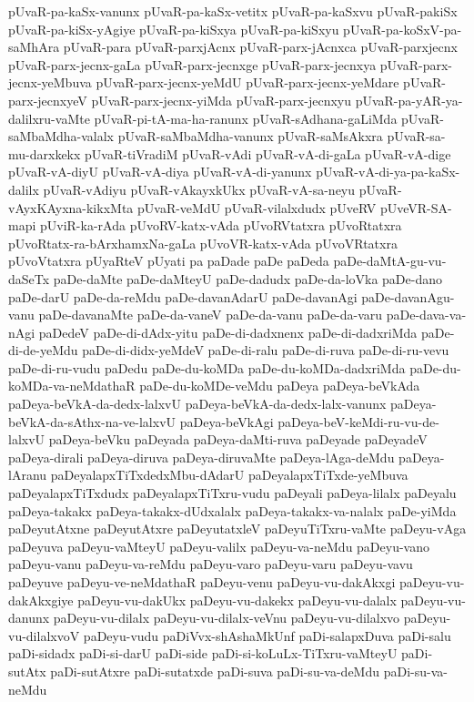 {pUvaR-pa-kaSx-vanunx
pUvaR-pa-kaSx-vetitx
pUvaR-pa-kaSxvu
pUvaR-pakiSx
pUvaR-pa-kiSx-yAgiye
pUvaR-pa-kiSxya
pUvaR-pa-kiSxyu
pUvaR-pa-koSxV-pa-saMhAra
pUvaR-para
pUvaR-parxjAcnx
pUvaR-parx-jAcnxca
pUvaR-parxjecnx
pUvaR-parx-jecnx-gaLa
pUvaR-parx-jecnxge
pUvaR-parx-jecnxya
pUvaR-parx-jecnx-yeMbuva
pUvaR-parx-jecnx-yeMdU
pUvaR-parx-jecnx-yeMdare
pUvaR-parx-jecnxyeV
pUvaR-parx-jecnx-yiMda
pUvaR-parx-jecnxyu
pUvaR-pa-yAR-ya-dalilxru-vaMte
pUvaR-pi-tA-ma-ha-ranunx
pUvaR-sAdhana-gaLiMda
pUvaR-saMbaMdha-valalx
pUvaR-saMbaMdha-vanunx
pUvaR-saMsAkxra
pUvaR-sa-mu-darxkekx
pUvaR-tiVradiM
pUvaR-vAdi
pUvaR-vA-di-gaLa
pUvaR-vA-dige
pUvaR-vA-diyU
pUvaR-vA-diya
pUvaR-vA-di-yanunx
pUvaR-vA-di-ya-pa-kaSx-dalilx
pUvaR-vAdiyu
pUvaR-vAkayxkUkx
pUvaR-vA-sa-neyu
pUvaR-vAyxKAyxna-kikxMta
pUvaR-veMdU
pUvaR-vilalxdudx
pUveRV
pUveVR-SA-mapi
pUviR-ka-rAda
pUvoRV-katx-vAda
pUvoRVtatxra
pUvoRtatxra
pUvoRtatx-ra-bArxhamxNa-gaLa
pUvoVR-katx-vAda
pUvoVRtatxra
pUvoVtatxra
pUyaRteV
pUyati
pa
paDade
paDe
paDeda
paDe-daMtA-gu-vu-daSeTx
paDe-daMte
paDe-daMteyU
paDe-dadudx
paDe-da-loVka
paDe-dano
paDe-darU
paDe-da-reMdu
paDe-davanAdarU
paDe-davanAgi
paDe-davanAgu-vanu
paDe-davanaMte
paDe-da-vaneV
paDe-da-vanu
paDe-da-varu
paDe-dava-va-nAgi
paDedeV
paDe-di-dAdx-yitu
paDe-di-dadxnenx
paDe-di-dadxriMda
paDe-di-de-yeMdu
paDe-di-didx-yeMdeV
paDe-di-ralu
paDe-di-ruva
paDe-di-ru-vevu
paDe-di-ru-vudu
paDedu
paDe-du-koMDa
paDe-du-koMDa-dadxriMda
paDe-du-koMDa-va-neMdathaR
paDe-du-koMDe-veMdu
paDeya
paDeya-beVkAda
paDeya-beVkA-da-dedx-lalxvU
paDeya-beVkA-da-dedx-lalx-vanunx
paDeya-beVkA-da-sAthx-na-ve-lalxvU
paDeya-beVkAgi
paDeya-beV-keMdi-ru-vu-de-lalxvU
paDeya-beVku
paDeyada
paDeya-daMti-ruva
paDeyade
paDeyadeV
paDeya-dirali
paDeya-diruva
paDeya-diruvaMte
paDeya-lAga-deMdu
paDeya-lAranu
paDeyalapxTiTxdedxMbu-dAdarU
paDeyalapxTiTxde-yeMbuva
paDeyalapxTiTxdudx
paDeyalapxTiTxru-vudu
paDeyali
paDeya-lilalx
paDeyalu
paDeya-takakx
paDeya-takakx-dUdxalalx
paDeya-takakx-va-nalalx
paDe-yiMda
paDeyutAtxne
paDeyutAtxre
paDeyutatxleV
paDeyuTiTxru-vaMte
paDeyu-vAga
paDeyuva
paDeyu-vaMteyU
paDeyu-valilx
paDeyu-va-neMdu
paDeyu-vano
paDeyu-vanu
paDeyu-va-reMdu
paDeyu-varo
paDeyu-varu
paDeyu-vavu
paDeyuve
paDeyu-ve-neMdathaR
paDeyu-venu
paDeyu-vu-dakAkxgi
paDeyu-vu-dakAkxgiye
paDeyu-vu-dakUkx
paDeyu-vu-dakekx
paDeyu-vu-dalalx
paDeyu-vu-danunx
paDeyu-vu-dilalx
paDeyu-vu-dilalx-veVnu
paDeyu-vu-dilalxvo
paDeyu-vu-dilalxvoV
paDeyu-vudu
paDiVvx-shAshaMkUnf
paDi-salapxDuva
paDi-salu
paDi-sidadx
paDi-si-darU
paDi-side
paDi-si-koLuLx-TiTxru-vaMteyU
paDi-sutAtx
paDi-sutAtxre
paDi-sutatxde
paDi-suva
paDi-su-va-deMdu
paDi-su-va-neMdu
}
